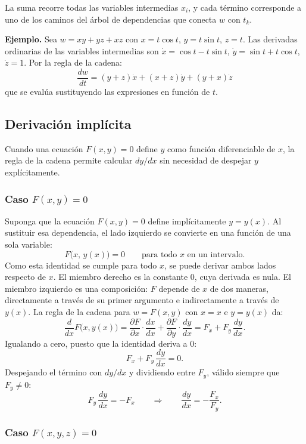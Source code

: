 La suma recorre todas las variables intermedias $x_i$, y cada término corresponde a uno de los caminos del árbol de dependencias que conecta $w$ con $t_k$.

\textbf{Ejemplo.} Sea $w = xy + yz + xz$ con $x = t\cos t$, $y = t\sin t$, $z = t$. Las derivadas ordinarias de las variables intermedias son $\dot{x} = \cos t - t\sin t$, $\dot{y} = \sin t + t\cos t$, $\dot{z} = 1$. Por la regla de la cadena:
\[
\frac{dw}{dt}
= (y + z)\dot{x} + (x + z)\dot{y} + (y + x)\dot{z}
\]
que se evalúa sustituyendo las expresiones en función de $t$.

\subsection{Derivación implícita}

Cuando una ecuación $F(x, y) = 0$ define $y$ como función diferenciable de $x$, la regla de la cadena permite calcular $dy/dx$ sin necesidad de despejar $y$ explícitamente.

\subsubsection*{Caso $F(x, y) = 0$}

Suponga que la ecuación $F(x, y) = 0$ define implícitamente $y = y(x)$. Al sustituir esa dependencia, el lado izquierdo se convierte en una función de una sola variable:
\[
F\bigl(x,\, y(x)\bigr) = 0 \qquad \text{para todo } x \text{ en un intervalo.}
\]
Como esta identidad se cumple para todo $x$, se puede derivar ambos lados respecto de $x$. El miembro derecho es la constante $0$, cuya derivada es nula. El miembro izquierdo es una composición: $F$ depende de $x$ de dos maneras, directamente a través de su primer argumento e indirectamente a través de $y(x)$. La regla de la cadena para $w = F(x, y)$ con $x = x$ e $y = y(x)$ da:
\[
\frac{d}{dx}F\bigl(x, y(x)\bigr)
= \frac{\partial F}{\partial x}\cdot\frac{dx}{dx} + \frac{\partial F}{\partial y}\cdot\frac{dy}{dx}
= F_x + F_y\,\frac{dy}{dx}.
\]
Igualando a cero, puesto que la identidad deriva a $0$:
\[
F_x + F_y\,\frac{dy}{dx} = 0.
\]
Despejando el término con $dy/dx$ y dividiendo entre $F_y$, válido siempre que $F_y \neq 0$:
\[
F_y\,\frac{dy}{dx} = -F_x
\qquad\Longrightarrow\qquad
\frac{dy}{dx} = -\frac{F_x}{F_y}.
\]

\subsubsection*{Caso $F(x, y, z) = 0$}

